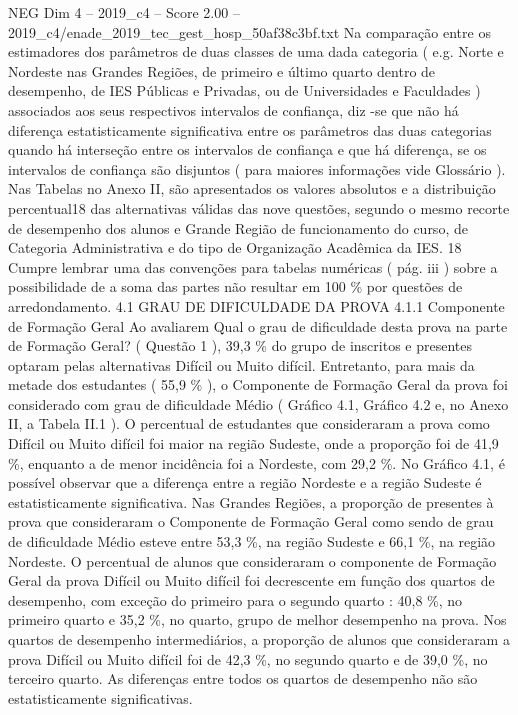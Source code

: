 \begin{textsample}{NEG Dim 4 – 2019\_c4 – Score 2.00 – 2019\_c4/enade\_2019\_tec\_gest\_hosp\_50af38c3bf.txt}
Na comparação entre os estimadores dos parâmetros de duas classes de uma dada categoria ( e.g.
Norte e Nordeste nas Grandes Regiões, de primeiro e último quarto dentro de desempenho, de IES Públicas e Privadas, ou de Universidades e Faculdades ) associados aos seus respectivos intervalos de confiança, diz -se que não há diferença estatisticamente significativa entre os parâmetros das duas categorias quando há interseção entre os intervalos de confiança e que há diferença, se os intervalos de confiança são disjuntos ( para maiores informações vide Glossário ).
Nas Tabelas no Anexo II, são apresentados os valores absolutos e a distribuição percentual18 das alternativas válidas das nove questões, segundo o mesmo recorte de desempenho dos alunos e Grande Região de funcionamento do curso, de Categoria Administrativa e do tipo de Organização Acadêmica da IES. 18 Cumpre lembrar uma das convenções para tabelas numéricas ( pág. iii ) sobre a possibilidade de a soma das partes não resultar em 100 \% por questões de arredondamento. 4.1 GRAU DE DIFICULDADE DA PROVA 4.1.1 Componente de Formação Geral Ao avaliarem Qual o grau de dificuldade desta prova na parte de Formação Geral? ( Questão 1 ), 39,3 \% do grupo de inscritos e presentes optaram pelas alternativas Difícil ou Muito difícil.
Entretanto, para mais da metade dos estudantes ( 55,9 \% ), o Componente de Formação Geral da prova foi considerado com grau de dificuldade Médio ( Gráfico 4.1, Gráfico 4.2 e, no Anexo II, a Tabela II.1 ).
O percentual de estudantes que consideraram a prova como Difícil ou Muito difícil foi maior na região Sudeste, onde a proporção foi de 41,9 \%, enquanto a de menor incidência foi a Nordeste, com 29,2 \%.
No Gráfico 4.1, é possível observar que a diferença entre a região Nordeste e a região Sudeste é estatisticamente significativa.
Nas Grandes Regiões, a proporção de presentes à prova que consideraram o Componente de Formação Geral como sendo de grau de dificuldade Médio esteve entre 53,3 \%, na região Sudeste e 66,1 \%, na região Nordeste.
O percentual de alunos que consideraram o componente de Formação Geral da prova Difícil ou Muito difícil foi decrescente em função dos quartos de desempenho, com exceção do primeiro para o segundo quarto : 40,8 \%, no primeiro quarto e 35,2 \%, no quarto, grupo de melhor desempenho na prova.
Nos quartos de desempenho intermediários, a proporção de alunos que consideraram a prova Difícil ou Muito difícil foi de 42,3 \%, no segundo quarto e de 39,0 \%, no terceiro quarto.
As diferenças entre todos os quartos de desempenho não são estatisticamente significativas.

\end{textsample}
